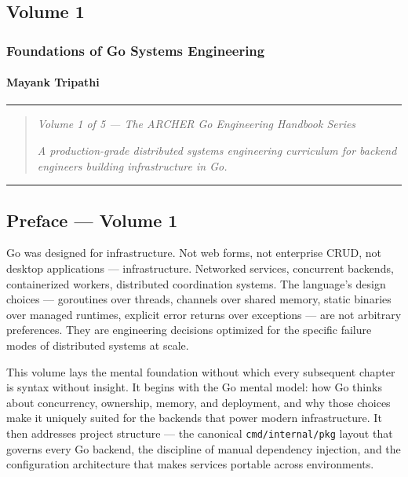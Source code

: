 \documentclass[11pt,openany]{book}
\begin{document}
\hypertarget{volume-1}{%
\subsection{Volume 1}\label{volume-1}}

\hypertarget{foundations-of-go-systems-engineering}{%
\subsubsection{Foundations of Go Systems
Engineering}\label{foundations-of-go-systems-engineering}}

\hypertarget{mayank-tripathi}{%
\paragraph{Mayank Tripathi}\label{mayank-tripathi}}

\begin{center}\rule{0.5\linewidth}{0.5pt}\end{center}

\begin{quote}
\emph{Volume 1 of 5 --- The ARCHER Go Engineering Handbook Series}

\emph{A production-grade distributed systems engineering curriculum for
backend engineers building infrastructure in Go.}
\end{quote}

\begin{center}\rule{0.5\linewidth}{0.5pt}\end{center}

\hypertarget{preface-volume-1}{%
\subsection{Preface --- Volume 1}\label{preface-volume-1}}

Go was designed for infrastructure. Not web forms, not enterprise CRUD,
not desktop applications --- infrastructure. Networked services,
concurrent backends, containerized workers, distributed coordination
systems. The language's design choices --- goroutines over threads,
channels over shared memory, static binaries over managed runtimes,
explicit error returns over exceptions --- are not arbitrary
preferences. They are engineering decisions optimized for the specific
failure modes of distributed systems at scale.

This volume lays the mental foundation without which every subsequent
chapter is syntax without insight. It begins with the Go mental model:
how Go thinks about concurrency, ownership, memory, and deployment, and
why those choices make it uniquely suited for the backends that power
modern infrastructure. It then addresses project structure --- the
canonical \texttt{cmd/internal/pkg} layout that governs every Go
backend, the discipline of manual dependency injection, and the
configuration architecture that makes services portable across
environments.
\end{document}
